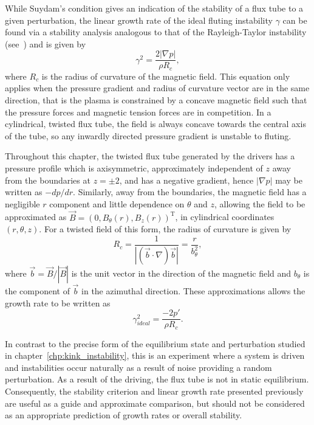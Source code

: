 While Suydam's condition gives an indication of the stability of a flux tube to a given perturbation, the linear growth rate of the ideal fluting instability $\gamma$ can be found via a stability analysis analogous to that of the Rayleigh-Taylor instability (see~\cite{goldstonIntroductionPlasmaPhysics2020}) and is given by
\begin{equation}
  \label{eq:fluting_growth_rate}
\gamma^2 = \frac{2|\nabla p|}{\rho R_c},
\end{equation}
where $R_c$ is the radius of curvature of the magnetic field. This equation only applies when the pressure gradient and radius of curvature vector are in the same direction, that is the plasma is constrained by a concave magnetic field such that the pressure forces and magnetic tension forces are in competition. In a cylindrical, twisted flux tube, the field is always concave towards the central axis of the tube, so any inwardly directed pressure gradient is unstable to fluting.

Throughout this chapter, the twisted flux tube generated by the drivers has a pressure profile which is axisymmetric, approximately independent of $z$ away from the boundaries at $z=\pm2$, and has a negative gradient, hence $|\nabla p|$ may be written as $-d p/ dr$. Similarly, away from the boundaries, the magnetic field has a negligible $r$ component and little dependence on $\theta$ and $z$, allowing the field to be approximated as $\vec{B} = (0, B_{\theta}(r), B_z(r))^{\text{T}}$, in cylindrical coordinates $(r, \theta, z)$. For a twisted field of this form, the radius of curvature is given by 
\begin{equation}
  \label{eq:radius_of_curvature}
  R_c = \frac{1}{|(\vec{b}\cdot\nabla) \vec{b}|} = \frac{r}{b_{\theta}^2},
\end{equation}
where $\vec{b} = \vec{B}/|\vec{B}|$ is the unit vector in the direction of the magnetic field and $b_{\theta}$ is the component of $\vec{b}$ in the azimuthal direction. These approximations allows the growth rate to be written as
\begin{equation}
  \label{eq:fluting_growth_rate2}
\gamma_{ideal}^2 = \frac{-2p'}{\rho R_c}.
\end{equation}

In contrast to the precise form of the equilibrium state and perturbation studied in chapter~\ref{chp:kink_instability}, this is an experiment where a system is driven and instabilities occur naturally as a result of noise providing a random perturbation. As a result of the driving, the flux tube is not in static equilibrium. Consequently, the stability criterion and linear growth rate presented previously are useful as a guide and approximate comparison, but should not be considered as an appropriate prediction of growth rates or overall stability.

